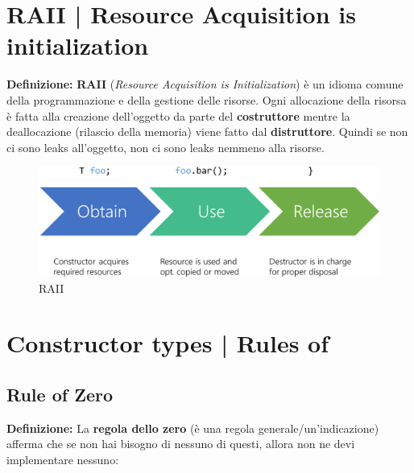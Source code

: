
\section{RAII | Resource Acquisition is initialization}

\textsf{\small \textbf{Definizione: } \textbf{RAII} (\emph{Resource Acquisition is Initialization}) è un idioma comune della programmazione e della gestione delle risorse. Ogni allocazione della risorsa è fatta alla creazione dell'oggetto da parte del \textbf{costruttore} mentre la deallocazione (rilascio della memoria) viene fatto dal \textbf{distruttore}. Quindi se non ci sono leaks all'oggetto, non ci sono leaks nemmeno alla risorse. } \\

\begin{figure}[ht]
	\centering
	\includegraphics[width=1\textwidth, height=1\textheight, keepaspectratio]{./imgs/RAII.png}
	\caption{RAII}
	\label{fig:RAII}
\end{figure}



\section{Constructor types | Rules of}

\subsection{Rule of Zero}

\textsf{\small \textbf{Definizione: } La \textbf{regola dello zero} (è una regola generale/un'indicazione) afferma che se non hai bisogno di nessuno di questi, allora non ne devi implementare nessuno: } \\

